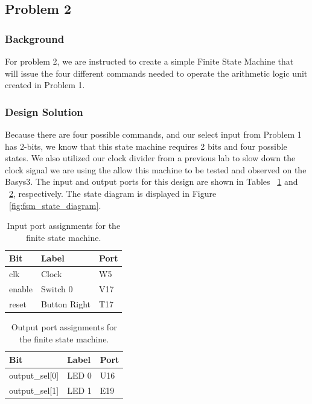 \documentclass[11pt]{article}
\begin{document}
\subsection{Problem 2 }

\subsubsection{Background}
For problem 2, we are instructed to create a simple Finite State Machine that will issue the four different commands needed to operate the arithmetic logic unit created in Problem 1.

\subsubsection{Design Solution}
Because there are four possible commands, and our select input from Problem 1 has 2-bits, we know that this state machine requires 2 bits and four possible states. We also utilized our clock divider from a previous lab to slow down the clock signal we are using the allow this machine to be tested and observed on the Basys3. The input and output ports for this design are shown in Tables ~\ref{tab:fsm_input_Ports} and ~\ref{tab:fsm_output_Ports}, respectively. The state diagram is displayed in Figure ~\ref{fig:fsm_state_diagram}.

\begin{table}[H]
\begin{center}
\begin{tabular}{| l | l | l |}
	\hline
	Bit & Label & Port \\ \hline
	clk &  Clock & W5 \\ \hline
	enable & Switch 0 & V17 \\ \hline
	reset & Button Right & T17 \\ \hline
\end{tabular}
\caption{\label{tab:fsm_input_Ports}Input port assignments for  the finite state machine.}
\end{center}
\end{table}

\begin{table}[H]
\begin{center}
\begin{tabular}{| l | l | l |}
	\hline
	Bit & Label & Port \\ \hline
	output\_sel[0] & LED 0 & U16 \\ \hline
	output\_sel[1] & LED 1 & E19 \\ \hline
\end{tabular}
\caption{\label{tab:fsm_output_Ports}Output port assignments for the finite state machine.}
\end{center}
\end{table}
\end{document}

